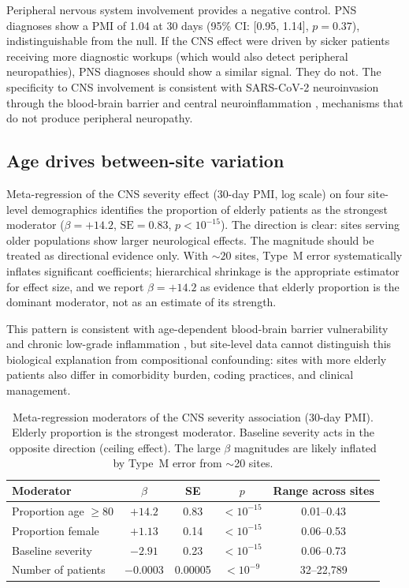 \documentclass{article}
\begin{document}
Peripheral nervous system involvement provides a negative control.  PNS
diagnoses show a PMI of 1.04 at 30 days (95\% CI: [0.95, 1.14],
$p = 0.37$), indistinguishable from the null.  If the CNS effect were
driven by sicker patients receiving more diagnostic workups (which would
also detect peripheral neuropathies), PNS diagnoses should show a similar
signal.  They do not.  The specificity to CNS involvement is consistent
with SARS-CoV-2 neuroinvasion through the blood-brain barrier
\cite{song2021neuroinvasion} and central neuroinflammation
\cite{iadecola2020covid}, mechanisms that do not produce peripheral
neuropathy.


\subsection{Age drives between-site variation}

Meta-regression of the CNS severity effect (30-day PMI, log scale) on four
site-level demographics identifies the proportion of elderly patients as the
strongest moderator ($\beta = +14.2$, $\text{SE} = 0.83$,
$p < 10^{-15}$).  The direction is clear: sites serving older populations
show larger neurological effects.  The magnitude should be treated as
directional evidence only.  With ${\sim}20$ sites, Type~M error
\cite{gelman2014typeMS} systematically inflates significant coefficients;
hierarchical shrinkage is the appropriate estimator for effect size, and
we report $\beta = +14.2$ as evidence that elderly proportion is the
dominant moderator, not as an estimate of its strength.

This pattern is consistent with age-dependent blood-brain barrier
vulnerability \cite{montagne2015bbb} and chronic low-grade inflammation
\cite{franceschi2018inflammaging}, but site-level data cannot distinguish
this biological explanation from compositional confounding: sites with more
elderly patients also differ in comorbidity burden, coding practices, and
clinical management.

\begin{table}[t]
\centering
\caption{Meta-regression moderators of the CNS severity association (30-day
PMI).  Elderly proportion is the strongest moderator.  Baseline severity
acts in the opposite direction (ceiling effect).  The large $\beta$
magnitudes are likely inflated by Type~M error \cite{gelman2014typeMS} from
$\sim$20 sites.}
\label{tab:moderators}
\begin{tabular}{lcccc}
\toprule
Moderator & $\beta$ & SE & $p$ & Range across sites \\
\midrule
Proportion age $\geq 80$ & $+14.2$ & 0.83 & $< 10^{-15}$ & 0.01--0.43 \\
Proportion female & $+1.13$ & 0.14 & $< 10^{-15}$ & 0.06--0.53 \\
Baseline severity & $-2.91$ & 0.23 & $< 10^{-15}$ & 0.06--0.73 \\
Number of patients & $-0.0003$ & 0.00005 & $< 10^{-9}$ & 32--22{,}789 \\
\bottomrule
\end{tabular}
\end{table}
\end{document}
